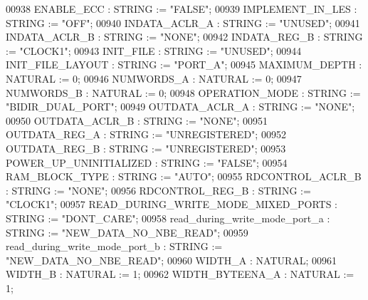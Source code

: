 \begin{DoxyCode}
{00938         ENABLE\_ECC  :   \textcolor{comment}{STRING} := \textcolor{keyword}{"FALSE"};
00939         IMPLEMENT\_IN\_LES    :   \textcolor{comment}{STRING} := \textcolor{keyword}{"OFF"};
00940         INDATA\_ACLR\_A   :   \textcolor{comment}{STRING} := \textcolor{keyword}{"UNUSED"};
00941         INDATA\_ACLR\_B   :   \textcolor{comment}{STRING} := \textcolor{keyword}{"NONE"};
00942         INDATA\_REG\_B    :   \textcolor{comment}{STRING} := \textcolor{keyword}{"CLOCK1"};
00943         INIT\_FILE   :   \textcolor{comment}{STRING} := \textcolor{keyword}{"UNUSED"};
00944         INIT\_FILE\_LAYOUT    :   \textcolor{comment}{STRING} := \textcolor{keyword}{"PORT\_A"};
00945         MAXIMUM\_DEPTH   :   \textcolor{comment}{NATURAL} := \textcolor{vhdllogic}{}\textcolor{vhdllogic}{0};
00946         NUMWORDS\_A  :   \textcolor{comment}{NATURAL} := \textcolor{vhdllogic}{}\textcolor{vhdllogic}{0};
00947         NUMWORDS\_B  :   \textcolor{comment}{NATURAL} := \textcolor{vhdllogic}{}\textcolor{vhdllogic}{0};
00948         OPERATION\_MODE  :   \textcolor{comment}{STRING} := \textcolor{keyword}{"BIDIR\_DUAL\_PORT"};
00949         OUTDATA\_ACLR\_A  :   \textcolor{comment}{STRING} := \textcolor{keyword}{"NONE"};
00950         OUTDATA\_ACLR\_B  :   \textcolor{comment}{STRING} := \textcolor{keyword}{"NONE"};
00951         OUTDATA\_REG\_A   :   \textcolor{comment}{STRING} := \textcolor{keyword}{"UNREGISTERED"};
00952         OUTDATA\_REG\_B   :   \textcolor{comment}{STRING} := \textcolor{keyword}{"UNREGISTERED"};
00953         POWER\_UP\_UNINITIALIZED  :   \textcolor{comment}{STRING} := \textcolor{keyword}{"FALSE"};
00954         RAM\_BLOCK\_TYPE  :   \textcolor{comment}{STRING} := \textcolor{keyword}{"AUTO"};
00955         RDCONTROL\_ACLR\_B    :   \textcolor{comment}{STRING} := \textcolor{keyword}{"NONE"};
00956         RDCONTROL\_REG\_B :   \textcolor{comment}{STRING} := \textcolor{keyword}{"CLOCK1"};
00957         READ\_DURING\_WRITE\_MODE\_MIXED\_PORTS  :   \textcolor{comment}{STRING} := \textcolor{keyword}{"DONT\_CARE"};
00958         read\_during\_write\_mode\_port\_a   :   \textcolor{comment}{STRING} := \textcolor{keyword}{"NEW\_DATA\_NO\_NBE\_READ"};
00959         read\_during\_write\_mode\_port\_b   :   \textcolor{comment}{STRING} := \textcolor{keyword}{"NEW\_DATA\_NO\_NBE\_READ"};
00960         WIDTH\_A :   \textcolor{comment}{NATURAL};
00961         WIDTH\_B :   \textcolor{comment}{NATURAL} := \textcolor{vhdllogic}{}\textcolor{vhdllogic}{1};
00962         WIDTH\_BYTEENA\_A :   \textcolor{comment}{NATURAL} := \textcolor{vhdllogic}{}\textcolor{vhdllogic}{1};
}
\end{DoxyCode}
